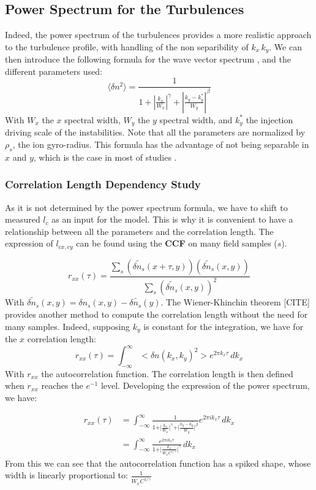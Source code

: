 \documentclass[11pt,openany]{report}
\begin{document}
\begin{multicols}{2}
    \subsection{Power Spectrum for the Turbulences}

    Indeed, the power spectrum of the turbulences provides a more realistic approach to the turbulence profile, with handling of the non separibility of $k_x \, k_y$. We can then introduce the following formula for the wave vector spectrum \cite{Unseparable_Turbulence_Spectra}, and the different parameters used:
    $$
        \langle\delta n^2 \rangle = \frac{1}{1 + \left| \frac{k_x}{W_x} \right|^\gamma + \left| \frac{k_y - k_y^*}{W_y} \right|^\beta}
    $$
    With $W_x$ the $x$ spectral width, $W_y$ the $y$ spectral width, and $k_y^*$ the injection driving scale of the instabilities. Note that all the parameters are normalized by $\rho_s$, the ion gyro-radius. This formula has the advantage of not being separable in $x$ and $y$, which is the case in most of studies \cite{Power_spectrum_coupled}.

    \subsubsection{Correlation Length Dependency Study}

    As it is not determined by the power spectrum formula, we have to shift to measured $l_c$ as an input for the model. This is why it is convenient to have a relationship between all the parameters and the correlation length. The expression of $l_{cx,cy}$ can be found using the \textbf{CCF} on many field samples ($s$).

    $$
        r_{xx}(\tau) = \frac{\sum_{s}\left(\tilde{\delta n_s}(x + \tau, y)\right)\left(\tilde{\delta n_s}(x, y)\right)}{\sum_{s}\left(\tilde{\delta n_s}(x, y)\right)^2}
    $$
    With $\tilde{\delta n_s}(x,y) = \delta n_s(x,y) - \bar{\delta n_s}(y)$. The Wiener-Khinchin theorem [CITE] provides another method to compute the correlation length without the need for many samples. Indeed, supposing $k_y$ is constant for the integration, we have for the $x$ correlation length:
    $$
        r_{xx}(\tau) = \int_{-\infty}^{\infty} <\delta n(k_x, k_y)^2> e^{2 \pi k_x \tau} \, dk_x
    $$
    With $r_{xx}$ the autocorrelation function. The correlation length is then defined when $r_{xx}$ reaches the $e^{-1}$ level. Developing the expression of the power spectrum, we have:

    \begin{align}
        r_{x x}(\tau) & = \int_{-\infty}^{\infty} \frac{1}{1 + \vert \frac{k_x}{W_x} \vert^\gamma + \vert \frac{k_y - k_y^*}{W_y}\vert^\beta} e^{2 \pi i k_x \tau} \, dk_x \\
                      & = \int_{-\infty}^{\infty} \frac{e^{2 \pi i k_x \tau}}{1 + \vert \frac{k_x}{W_x C^{1/ \gamma}} \vert^\gamma} \, dk_x
    \end{align}
    From this we can see that the autocorrelation function has a spiked shape, whose width is linearly proportional to:
    $\frac{1}{W_x C^{1/ \gamma}}$


\end{multicols}
\end{document}
